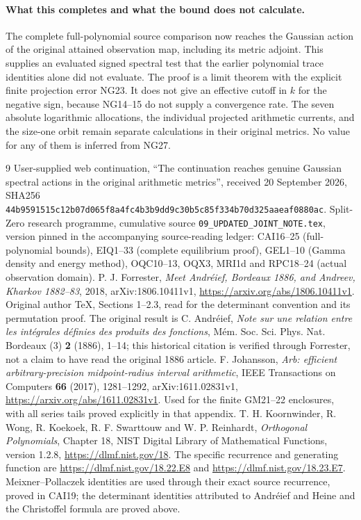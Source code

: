 \paragraph{What this completes and what the bound does not calculate.}
The complete full-polynomial source comparison now reaches the Gaussian
action of the original attained observation map, including its metric
adjoint. This supplies an evaluated signed spectral test that the earlier
polynomial trace identities alone did not evaluate. The proof is a limit
theorem with the explicit finite projection error NG23. It does not give
an effective cutoff in $k$ for the negative sign, because NG14--15 do not
supply a convergence rate. The seven absolute logarithmic allocations,
the individual projected arithmetic currents, and the size-one orbit
remain separate calculations in their original metrics. No value for
any of them is inferred from NG27.

\begin{thebibliography}{9}
 User-supplied web continuation, ``The continuation reaches
genuine Gaussian spectral actions in the original arithmetic metrics'',
received 20 September 2026, SHA256
\texttt{44b9591515c12b07d065f8a4fc4b3b9dd9c30b5c85f334b70d325aaeaf0880ac}.
 Split-Zero research programme, cumulative source
\texttt{09\_UPDATED\_JOINT\_NOTE.tex}, version pinned in the accompanying
source-reading ledger: CAI16--25 (full-polynomial bounds), EIQ1--33
(complete equilibrium proof), GEL1--10 (Gamma density and energy method),
OQC10--13, OQX3, MRI1d and RPC18--24 (actual observation domain).
 P. J. Forrester, \emph{Meet Andr\'eief, Bordeaux 1886,
and Andreev, Kharkov 1882--83}, 2018, arXiv:1806.10411v1,
\url{https://arxiv.org/abs/1806.10411v1}. Original author TeX, Sections
1--2.3, read for the determinant convention and its permutation proof.
The original result is C. Andr\'eief, \emph{Note sur une relation entre
les int\'egrales d\'efinies des produits des fonctions},
M\'em. Soc. Sci. Phys. Nat. Bordeaux (3) \textbf{2} (1886), 1--14;
this historical citation is verified through Forrester, not a claim
to have read the original 1886 article.
 F. Johansson, \emph{Arb: efficient arbitrary-precision
midpoint-radius interval arithmetic}, IEEE Transactions on Computers
\textbf{66} (2017), 1281--1292, arXiv:1611.02831v1,
\url{https://arxiv.org/abs/1611.02831v1}. Used for the finite GM21--22
enclosures, with all series tails proved explicitly in that appendix.
 T. H. Koornwinder, R. Wong, R. Koekoek,
R. F. Swarttouw and W. P. Reinhardt, \emph{Orthogonal Polynomials},
Chapter 18, NIST Digital Library of Mathematical Functions, version 1.2.8,
\url{https://dlmf.nist.gov/18}. The specific recurrence and generating
function are \url{https://dlmf.nist.gov/18.22.E8} and
\url{https://dlmf.nist.gov/18.23.E7}.
Meixner--Pollaczek identities are used through their exact source
recurrence, proved in CAI19; the determinant identities attributed to
Andr\'eief and Heine and the Christoffel formula are proved above.
\end{thebibliography}

